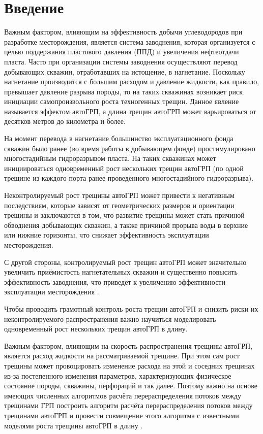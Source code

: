\chapter*{Введение} %


Важным фактором, влияющим на эффективность добычи углеводородов при разработке месторождения, является система заводнения, которая организуется с целью поддержания пластового давления (ППД) и увеличения нефтеотдачи пласта.
Часто при организации системы заводнения осуществляют перевод добывающих скважин, отработавших на истощение, в нагнетание.
Поскольку нагнетание производится с большим расходом и давление жидкости, как правило, превышает давление разрыва породы, то на таких скважинах возникает риск инициации самопроизвольного роста техногенных трещин.
Данное явление называется эффектом автоГРП, а длина трещин автоГРП может варьироваться от десятков метров до километра и более.

На момент перевода в нагнетание большинство эксплуатационного фонда скважин было ранее (во время работы в добывающем фонде) простимулировано многостадийным гидроразрывом пласта.
На таких скважинах может инициироваться одновременный рост нескольких трещин автоГРП (по одной трещине из каждого порта ранее проведённого многостадийного гидроразрыва).

Неконтролируемый рост трещины автоГРП может привести к негативным последствиям, которые зависят от геометрических размеров и ориентации трещины и заключаются в том, что развитие трещины может стать причиной обводнения добывающих скважин, а также причиной прорыва воды в верхние или нижние горизонты, что снижает эффективность эксплуатации месторождения.

С другой стороны, контролируемый рост трещин автоГРП может значительно увеличить приёмистость нагнетательных скважин и существенно повысить эффективность заводнения, что приведёт к увеличению эффективности эксплуатации месторождения \cite{bazyrov_shel, yakupov}.

Чтобы проводить грамотный контроль роста трещин автоГРП и снизить риски их неконтролируемого распространения важно научиться моделировать одновременный рост нескольких трещин автоГРП в длину.

Важным фактором, влияющим на скорость распространения трещины автоГРП, является расход жидкости на рассматриваемой трещине.
При этом сам рост трещины может провоцировать изменение расхода на этой и соседних трещинах из-за постепенного изменения параметров, характеризующих физическое состояние породы, скважины, перфораций и так далее.
Поэтому важно на основе имеющих численных алгоритмов расчёта перераспределения потоков между трещинами ГРП \cite{elbel} построить алгоритм расчёта перераспределения потоков между трещинами автоГРП и провести совмещение этого алгоритма с известными моделями роста трещины автоГРП в длину \cite{koning}.

